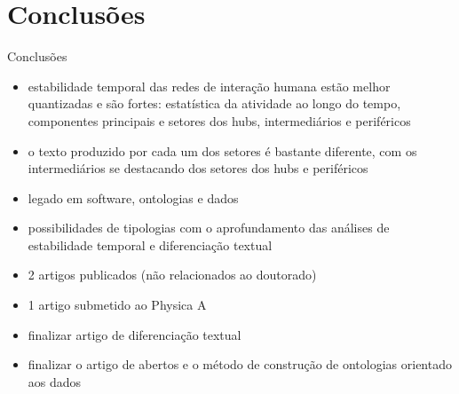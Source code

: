 \documentclass[10pt]{beamer}
\begin{document}
\section{Conclusões}
\begin{frame}{Conclusões}
\begin{itemize}
	\item estabilidade temporal das redes de interação humana estão melhor quantizadas e são fortes: estatística da atividade ao longo do tempo, componentes principais e setores dos hubs, intermediários e periféricos
	\item o texto produzido por cada um dos setores é bastante diferente, com os intermediários se destacando dos setores dos hubs e periféricos
	\item legado em software, ontologias e dados
	\item possibilidades de tipologias com o aprofundamento das análises de estabilidade temporal e diferenciação textual
	\item 2 artigos publicados (não relacionados ao doutorado)
	\item 1 artigo submetido ao Physica A
	\item finalizar artigo de diferenciação textual
	\item finalizar o artigo de abertos e o método de construção de ontologias orientado aos dados
\end{itemize}
\end{frame}
\end{document}
